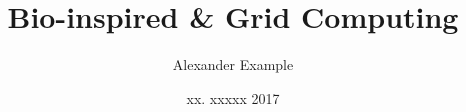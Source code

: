 \def\languages{main=ngerman,english}


\title{Bio-inspired \& Grid Computing}

\author{Alexander Example}

\date{xx. xxxxx 2017}


